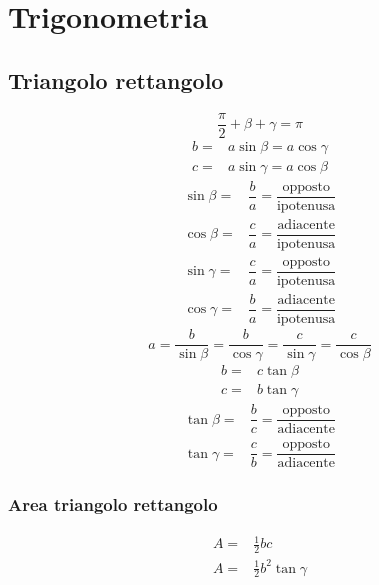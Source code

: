 \chapter{Trigonometria}
\section{Triangolo rettangolo}
\begin{center}
		
\end{center}
\begin{equation*}
\dfrac{\pi}{2}+\beta+\gamma=\pi
\end{equation*}
\begin{align*}
b=&a\sin\beta=a\cos\gamma\\
c=&a\sin\gamma=a\cos\beta
\end{align*}
\begin{align*}
\sin\beta=&\dfrac{b}{a}=\dfrac{\text{opposto}}{\text{ipotenusa}}\\
\cos\beta=&\dfrac{c}{a}=\dfrac{\text{adiacente}}{\text{ipotenusa}}\\
\sin\gamma=&\dfrac{c}{a}=\dfrac{\text{opposto}}{\text{ipotenusa}}\\
\cos\gamma=&\dfrac{b}{a}=\dfrac{\text{adiacente}}{\text{ipotenusa}}
\end{align*}
\begin{equation*}
a=\dfrac{b}{\sin\beta}=\dfrac{b}{\cos\gamma}=\dfrac{c}{\sin\gamma}=\dfrac{c}{\cos\beta}
\end{equation*}
\begin{align*}
b=&c\tan\beta\\
c=&b\tan\gamma
\end{align*}
\begin{align*}
\tan\beta=&\dfrac{b}{c}=\dfrac{\text{opposto}}{\text{adiacente}}\\
\tan\gamma=&\dfrac{c}{b}=\dfrac{\text{opposto}}{\text{adiacente}}
\end{align*}
\subsection{Area triangolo rettangolo}
\begin{align*}
A=&\frac{1}{2}bc\\
A=&\frac{1}{2}b^2\tan\gamma\\
\end{align*}
